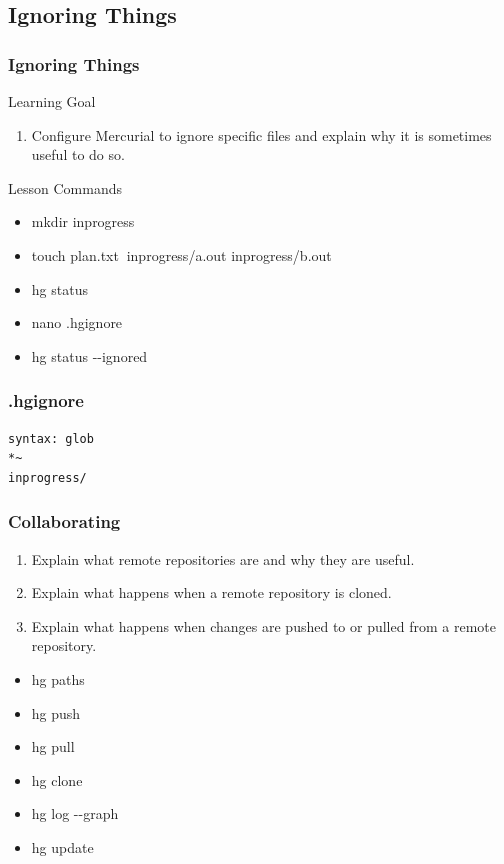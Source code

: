 \documentclass{beamer}
\renewcommand{\dh}{{-}{-}}
\begin{document}
\subsection*{Ignoring Things}
\begin{frame}[label=ignore]
\frametitle{Ignoring Things}
\begin{block}{Learning Goal}
\begin{enumerate}
\item Configure Mercurial to ignore specific files and explain why it is sometimes useful to do so.
\end{enumerate}
\end{block}
\begin{block}{Lesson Commands}
\begin{itemize}
\item mkdir inprogress
\item touch plan.txt$~$ inprogress/a.out inprogress/b.out
\item hg status
\item nano .hgignore
\item hg status \dh ignored
\end{itemize}
\end{block}
\end{frame}

\begin{frame}[fragile]
\frametitle{.hgignore}
\begin{verbatim}
syntax: glob
*~
inprogress/
\end{verbatim}
\end{frame}


\begin{frame}[label=Collaborating]
\frametitle{Collaborating}
\begin{enumerate}
  \item Explain what remote repositories are and why they are useful.
  \item Explain what happens when a remote repository is cloned.
  \item Explain what happens when changes are pushed to or pulled from a remote repository.
\end{enumerate}
\begin{multicols}{2}
\begin{itemize}
  \item hg paths
  \item hg push
  \item hg pull
  \item hg clone
  \item hg log \dh graph
  \item hg update
\end{itemize}
\end{multicols}
\end{frame}
\end{document}
